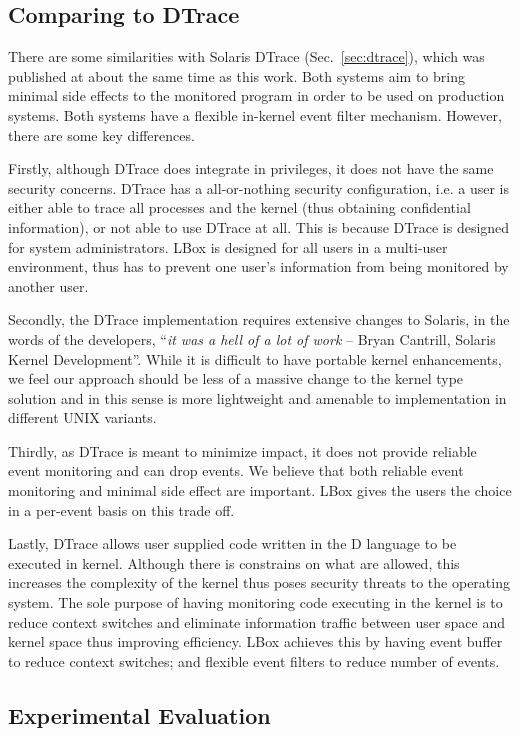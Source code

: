 \subsection{Comparing to DTrace}
\label{sec:lbox-dtrace}

There are some similarities with Solaris DTrace (Sec.~\ref{sec:dtrace}),
which was published at about the same time as this work.
Both systems aim to bring minimal side effects to the monitored program
in order to be used on production systems.
Both systems have a flexible in-kernel event filter mechanism.
However, there are some key differences.

Firstly, although DTrace does integrate in privileges,
it does not have the same security concerns.
DTrace has a all-or-nothing security configuration, i.e.
a user is either able to trace all processes and the kernel
(thus obtaining confidential information), or not able to use DTrace at all.
This is because DTrace is designed for system administrators.
LBox is designed for all users in a multi-user environment,
thus has to prevent one user's information from being monitored
by another user.

Secondly, the DTrace implementation requires extensive changes to Solaris,
in the words of the developers,
``{\it it was a hell of a lot of work} -- Bryan Cantrill, Solaris
Kernel Development''.
While it is difficult to have portable kernel enhancements, we feel our
approach should be less of a massive change to the kernel type solution and in
this sense is more lightweight and amenable to implementation
in different UNIX variants.

Thirdly, as DTrace is meant to minimize impact, it does not provide
reliable event monitoring and can drop events.
We believe that both reliable event monitoring and minimal side effect
are important.
LBox gives the users the choice in a per-event basis on this trade off.

Lastly, DTrace allows user supplied code written in the D language
to be executed in kernel.
Although there is constrains on what are allowed,
this increases the complexity of the kernel thus
poses security threats to the operating system.
The sole purpose of having monitoring code executing in the kernel is
to reduce context switches and eliminate information traffic between user
space and kernel space thus improving efficiency.
LBox achieves this by having event buffer to reduce context switches;
and flexible event filters to reduce number of events.

\subsection{Experimental Evaluation}
\label{sec:lbox-bench}

